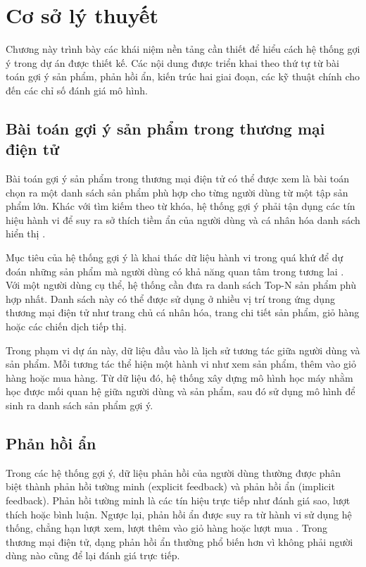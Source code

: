 ﻿\chapter{Cơ sở lý thuyết}

Chương này trình bày các khái niệm nền tảng cần thiết để hiểu cách hệ thống gợi ý trong dự án được thiết kế. Các nội dung được triển khai theo thứ tự từ bài toán gợi ý sản phẩm, phản hồi ẩn, kiến trúc hai giai đoạn, các kỹ thuật chính cho đến các chỉ số đánh giá mô hình.

\section{Bài toán gợi ý sản phẩm trong thương mại điện tử}
Bài toán gợi ý sản phẩm trong thương mại điện tử có thể được xem là bài toán chọn ra một danh sách sản phẩm phù hợp cho từng người dùng từ một tập sản phẩm lớn. Khác với tìm kiếm theo từ khóa, hệ thống gợi ý phải tận dụng các tín hiệu hành vi để suy ra sở thích tiềm ẩn của người dùng và cá nhân hóa danh sách hiển thị \cite{covington2016deep}.
\medskip

Mục tiêu của hệ thống gợi ý là khai thác dữ liệu hành vi trong quá khứ để dự đoán những sản phẩm mà người dùng có khả năng quan tâm trong tương lai \cite{covington2016deep}. Với một người dùng cụ thể, hệ thống cần đưa ra danh sách Top-N sản phẩm phù hợp nhất. Danh sách này có thể được sử dụng ở nhiều vị trí trong ứng dụng thương mại điện tử như trang chủ cá nhân hóa, trang chi tiết sản phẩm, giỏ hàng hoặc các chiến dịch tiếp thị.
\medskip

Trong phạm vi dự án này, dữ liệu đầu vào là lịch sử tương tác giữa người dùng và sản phẩm. Mỗi tương tác thể hiện một hành vi như xem sản phẩm, thêm vào giỏ hàng hoặc mua hàng. Từ dữ liệu đó, hệ thống xây dựng mô hình học máy nhằm học được mối quan hệ giữa người dùng và sản phẩm, sau đó sử dụng mô hình để sinh ra danh sách sản phẩm gợi ý.

\section{Phản hồi ẩn}
Trong các hệ thống gợi ý, dữ liệu phản hồi của người dùng thường được phân biệt thành phản hồi tường minh (explicit feedback) và phản hồi ẩn (implicit feedback). Phản hồi tường minh là các tín hiệu trực tiếp như đánh giá sao, lượt thích hoặc bình luận. Ngược lại, phản hồi ẩn được suy ra từ hành vi sử dụng hệ thống, chẳng hạn lượt xem, lượt thêm vào giỏ hàng hoặc lượt mua \cite{rendle2009bpr}. Trong thương mại điện tử, dạng phản hồi ẩn thường phổ biến hơn vì không phải người dùng nào cũng để lại đánh giá trực tiếp.
\medskip


